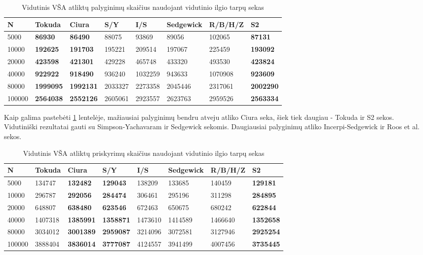 \documentclass{VUMIFInfKursinis}
\begin{document}
\begin{table}[H]
  \caption{Vidutinis VŠA atliktų palyginimų skaičius naudojant vidutinio ilgio tarpų sekas}
  \label{tss_medium_comparisons}
  \begin{tabular}{|l|l|l|l|l|l|l|l|}
  \hline
  N      & Tokuda           & Ciura            & S/Y     & I/S     & Sedgewick & R/B/H/Z & S2               \\ \hline
  5000   & \textbf{86930}   & \textbf{86490}   & 88075   & 93869   & 89056     & 102065  & \textbf{87131}   \\ \hline
  10000  & \textbf{192625}  & \textbf{191703}  & 195221  & 209514  & 197067    & 225459  & \textbf{193092}  \\ \hline
  20000  & \textbf{423598}  & \textbf{421301}  & 429228  & 465748  & 433320    & 493530  & \textbf{423824}  \\ \hline
  40000  & \textbf{922922}  & \textbf{918490}  & 936240  & 1032259 & 943633    & 1070908 & \textbf{923609}  \\ \hline
  80000  & \textbf{1999095} & \textbf{1992131} & 2033327 & 2273358 & 2045446   & 2317061 & \textbf{2002290} \\ \hline
  100000 & \textbf{2564038} & \textbf{2552126} & 2605061 & 2923557 & 2623763   & 2959526 & \textbf{2563334} \\ \hline
  \end{tabular}
\end{table}

Kaip galima pastebėti \ref{tss_medium_comparisons} lentelėje, mažiausiai palyginimų bendru atveju atliko Ciura seka,
šiek tiek daugiau - Tokuda ir S2 sekos.
Vidutiniški rezultatai gauti su Simpson-Yachavaram ir Sedgewick sekomis.
Daugiausiai palyginimų atliko Incerpi-Sedgewick ir Roos et al. sekos.

\begin{table}[H]
  \caption{Vidutinis VŠA atliktų priskyrimų skaičius naudojant vidutinio ilgio tarpų sekas}
  \label{tss_medium_assignments}
  \begin{tabular}{|l|l|l|l|l|l|l|l|}
  \hline
  N      & Tokuda  & Ciura            & S/Y              & I/S     & Sedgewick & R/B/H/Z & S2               \\ \hline
  5000   & 134747  & \textbf{132482}  & \textbf{129043}  & 138209  & 133685    & 140459  & \textbf{129181}  \\ \hline
  10000  & 296787  & \textbf{292056}  & \textbf{284474}  & 306461  & 295196    & 311298  & \textbf{284895}  \\ \hline
  20000  & 648807  & \textbf{638480}  & \textbf{623546}  & 672463  & 650675    & 680242  & \textbf{622844}  \\ \hline
  40000  & 1407318 & \textbf{1385991} & \textbf{1358871} & 1473610 & 1414589   & 1466640 & \textbf{1352658} \\ \hline
  80000  & 3034012 & \textbf{3001389} & \textbf{2959087} & 3214096 & 3072581   & 3127946 & \textbf{2925254} \\ \hline
  100000 & 3888404 & \textbf{3836014} & \textbf{3777087} & 4124557 & 3941499   & 4007456 & \textbf{3735445} \\ \hline
  \end{tabular}
\end{table}
\end{document}
